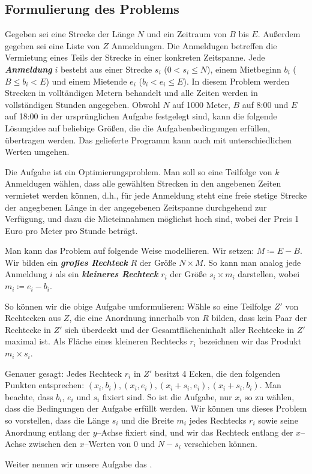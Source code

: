 \subsection{Formulierung des Problems}\label{sec:definitionen}
Gegeben sei eine Strecke der Länge $N$ und ein Zeitraum von $B$ bis $E$.
Außerdem gegeben sei eine Liste von $Z$ Anmeldungen. 
Die Anmeldugen betreffen die Vermietung eines Teils der Strecke in einer konkreten Zeitspanne.
Jede \textbf{\textit{Anmeldung}} $i$ besteht aus einer Strecke $s_i$ ($0 < s_i \leqslant N$),
einem Mietbeginn $b_i$ ($B \leqslant b_i < E$) und einem Mietende $e_i$ ($b_i < e_i \leqslant E$).
In diesem Problem werden Strecken in volltändigen Metern behandelt 
und alle Zeiten werden in vollständigen Stunden angegeben.
Obwohl $N$ auf 1000 Meter, $B$ auf 8:00 und $E$ auf 18:00 in der ursprünglichen Aufgabe festgelegt sind,
kann die folgende Lösungidee auf beliebige Größen, die die Aufgabenbedingungen erfüllen, übertragen werden.
Das gelieferte Programm kann auch mit unterschiedlichen Werten umgehen.

Die Aufgabe ist ein Optimierungsproblem.
Man soll so eine Teilfolge von $k$ Anmeldugen wählen,
dass alle gewählten Strecken in den angebenen Zeiten vermietet werden können, d.h.,
für jede Anmeldung steht eine freie stetige Strecke der angegbenen Länge 
in der angegebenen Zeitspanne durchgehend zur Verfügung,
und dazu die Mieteinnahmen möglichst hoch sind, wobei der Preis 1 Euro pro Meter pro Stunde beträgt.

Man kann das Problem auf folgende Weise modellieren. 
Wir setzen: $M \coloneqq E - B$.
Wir bilden ein \textit{\textbf{großes Rechteck}} $R$ der Größe $N \times M$.
So kann man analog jede Anmeldung $i$ als ein \textit{\textbf{kleineres Rechteck}}
$r_i$ der Größe $s_i \times m_i$ darstellen, wobei $m_i \coloneqq e_i - b_i$.

So können wir die obige Aufgabe umformulieren:
Wähle so eine Teilfolge $Z'$ von Rechtecken aus $Z$,
die eine Anordnung innerhalb von $R$ bilden,
dass kein Paar der Rechtecke in $Z'$ sich überdeckt und
der Gesamtflächeninhalt aller Rechtecke in $Z'$ maximal ist.
Als Fläche eines kleineren Rechtecks $r_i$ bezeichnen wir das Produkt $m_i \times s_i$.

Genauer gesagt: Jedes Rechteck $r_i$ in $Z'$ besitzt 4 Ecken,
die den folgenden Punkten entsprechen:
$(x_i, b_i), (x_i, e_i), (x_i + s_i, e_i), (x_i + s_i, b_i)$.
Man beachte, dass $b_i$, $e_i$ und $s_i$ fixiert sind. 
So ist die Aufgabe, nur $x_i$ so zu wählen, dass die Bedingungen der Aufgabe erfüllt werden.
Wir können uns dieses Problem so vorstellen, dass die Länge $s_i$ und die Breite $m_i$
jedes Rechtecks $r_i$ sowie seine Anordnung entlang der $y$--Achse fixiert sind,
und wir das Rechteck entlang der $x$--Achse zwischen den $x$--Werten von 0 und $N-s_i$ verschieben können.

Weiter nennen wir unsere Aufgabe das \fp.

